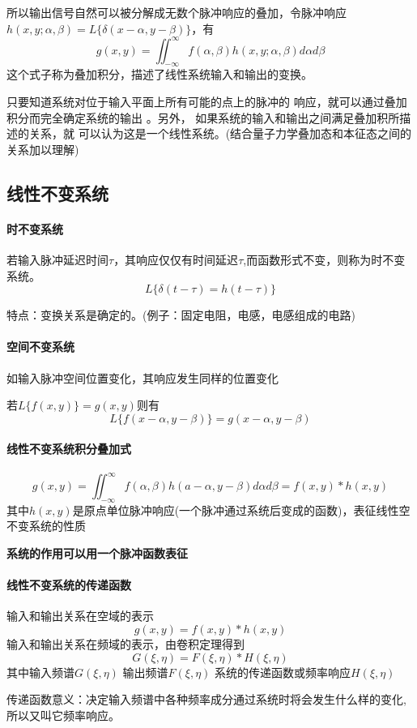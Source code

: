 \documentclass[UTF8]{ctexart}
\begin{document}
所以输出信号自然可以被分解成无数个脉冲响应的叠加，令脉冲响应$h(x,y;\alpha,\beta)=L\{\delta(x-\alpha,y-\beta)\}$，有
\[g(x,y)=\iint_{-\infty}^{\infty}f(\alpha,\beta)h(x,y;\alpha,\beta)d\alpha d\beta
    \]
这个式子称为叠加积分，描述了线性系统输入和输出的变换。

只要知道系统对位于输入平面上所有可能的点上的脉冲的
响应，就可以通过叠加积分而完全确定系统的输出 。另外，
如果系统的输入和输出之间满足叠加积所描述的关系，就
可以认为这是一个线性系统。(结合量子力学叠加态和本征态之间的关系加以理解)
\subsection{线性不变系统}
\paragraph{时不变系统}若输入脉冲延迟时间$\tau$，其响应仅仅有时间延迟$\tau$,而函数形式不变，则称为时不变系统。
\[
    L\{\delta(t-\tau)=h(t-\tau)
        \}\]

        特点：变换关系是确定的。(例子：固定电阻，电感，电感组成的电路)

\paragraph{空间不变系统}
如输入脉冲空间位置变化，其响应发生同样的位置变化

若$L\{f(x,y)\}=g(x,y)$则有
\[L\{f(x-\alpha,y-\beta)\}
=g(x-\alpha,y-\beta)
    \]
    \paragraph{线性不变系统积分叠加式}\[
        g(x,y)=\iint_{-\infty}^{\infty}f(\alpha,\beta)h(a-\alpha,y-\beta)d\alpha d\beta
        =f(x,y)*h(x,y)
        \]
        其中$h(x,y)$是原点单位脉冲响应(一个脉冲通过系统后变成的函数)，表征线性空不变系统的性质

        \textbf{系统的作用可以用一个脉冲函数表征}
\paragraph{线性不变系统的传递函数}输入和输出关系在空域的表示
\[
    g(x,y)=f(x,y)*h(x,y)
    \]
    输入和输出关系在频域的表示，由卷积定理得到
    \[
        G(\xi,\eta)=F(\xi,\eta)*H(\xi,\eta)
    \]
其中输入频谱$G(\xi,\eta)$
    输出频谱$F(\xi,\eta)$
    系统的传递函数或频率响应$H(\xi,\eta)$
    
    传递函数意义：决定输入频谱中各种频率成分通过系统时将会发生什么样的变化,所以又叫它频率响应。
    
\end{document}
